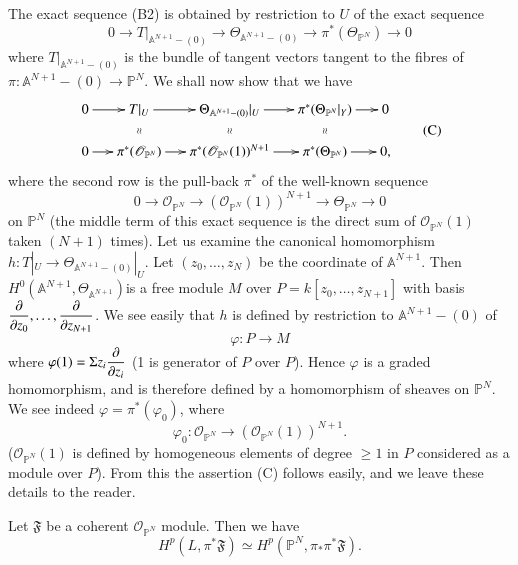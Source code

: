 {The exact sequence (B2) is obtained by restriction to $U$ of the exact
sequence 
\begin{equation*}
0\to T\Big|_{\mathbb{A}^{N+1}-(0)}\to \Theta_{\mathbb{A}^{N+1}-(0)}\to
\pi^{\ast}(\Theta_{\mathbb{P}^{N}})\to 0\tag{**}
\end{equation*}
where $T\big|_{\mathbb{A}^{N+1}-(0)}$ is the bundle of tangent vectors
tangent to the fibres of $\pi:\mathbb{A}^{N+1}-(0)\to
\mathbb{P}^{N}$. We shall now show that we have
\begin{equation*}
\vcenter{
\xymatrix@=.5cm{
0\ar[r] & T|_{U}\ar@{}[d]|{\wr\wr}\ar[r] &
\Theta_{\mathbb{A}^{N+1}-(0)}|_{U}\ar@{}[d]|{\wr\wr}\ar[r] &
\pi^{\ast}(\Theta_{\mathbb{P}^{N}}|_{Y})\ar@{}[d]|{\wr\wr}\ar[r] & 0\\
0\ar[r] & \pi^{\ast}(\mathscr{O}_{\mathbb{P}^{N}})\ar[r] &
\pi^{\ast}(\mathscr{O}_{\mathbb{P}^{N}}(1))^{N+1}\ar[r] &
\pi^{\ast}(\Theta_{\mathbb{P}^{N}})\ar[r] & 0,
}}\tag{C}
\end{equation*}
where the second row is the pull-back $\pi^{\ast}$ of the well-known
sequence
$$
0\to \mathscr{O}_{\mathbb{P}^{N}}\to
(\mathscr{O}_{\mathbb{P}^{N}}(1))^{N+1}\to \Theta_{\mathbb{P}^{N}}\to 0
$$
on $\mathbb{P}^{N}$ (the middle term of this exact sequence is the
direct sum of $\mathscr{O}_{\mathbb{P}^{N}}(1)$ taken $(N+1)$
times). Let us examine the canonical homomorphism $h:T|_{U}\to
\Theta_{\mathbb{A}^{N+1}-(0)}|_U$. Let $(z_{0},\ldots,z_{N})$ be the
coordinate of $\mathbb{A}^{N+1}$. Then
$H^{0}(\mathbb{A}^{N+1},\Theta_{\mathbb{A}^{N+1}})$\pageoriginale is a
free module $M$ over $P=k[z_{0},\ldots,z_{N+1}]$ with basis
$\dfrac{\partial}{\partial z_{0}},\ldots,\dfrac{\partial}{\partial z_{N+1}}$. We see easily
that $h$ is defined by restriction to $\mathbb{A}^{N+1}-(0)$ of
$$
\varphi:P\to M
$$
where $\varphi(1)=\Sigma z_{i}\dfrac{\partial}{\partial z_{i}}$ (1 is generator of
$P$ over $P$). Hence $\varphi$ is a graded homomorphism, and is
therefore defined by a homomorphism of sheaves on $\mathbb{P}^{N}$. We
see indeed $\varphi=\pi^{\ast}(\varphi_{0})$, where
$$
\varphi_{0}:\mathscr{O}_{\mathbb{P}^{N}}\to
(\mathscr{O}_{\mathbb{P}^{N}}(1))^{N+1}. 
$$
($\mathscr{O}_{\mathbb{P}^{N}}(1)$ is defined by homogeneous elements
of degree $\geq 1$ in $P$ considered as a module over $P$). From this
the assertion (C) follows easily, and we leave these details to the
reader.

Let $\mathfrak{F}$ be a coherent $\mathscr{O}_{\mathbb{P}^{N}}$
module. Then we have
$$
H^{p}(L,\pi^{\ast}\mathfrak{F})\simeq
H^{p}(\mathbb{P}^{N},\pi_{\ast}\pi^{\ast}\mathfrak{F}). 
$$

}
